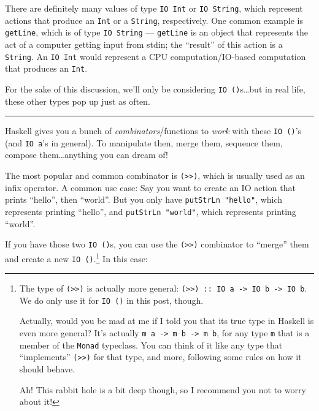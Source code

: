 \documentclass[]{article}
\begin{document}
There are definitely many values of type \texttt{IO\ Int} or
\texttt{IO\ String}, which represent actions that produce an
\texttt{Int} or a \texttt{String}, respectively. One common example is
\texttt{getLine}, which is of type \texttt{IO\ String} ---
\texttt{getLine} is an object that represents the act of a computer
getting input from stdin; the ``result'' of this action is a
\texttt{String}. An \texttt{IO\ Int} would represent a CPU
computation/IO-based computation that produces an \texttt{Int}.

For the sake of this discussion, we'll only be considering
\texttt{IO\ ()}s\ldots{}but in real life, these other types pop up just
as often.

\begin{center}\rule{0.5\linewidth}{\linethickness}\end{center}

Haskell gives you a bunch of \emph{combinators}/functions to \emph{work}
with these \texttt{IO\ ()}'s (and \texttt{IO\ a}'s in general). To
manipulate then, merge them, sequence them, compose them\ldots{}anything
you can dream of!

The most popular and common combinator is
\texttt{(\textgreater{}\textgreater{})}, which is usually used as an
infix operator. A common use case: Say you want to create an IO action
that prints ``hello'', then ``world''. But you only have
\texttt{putStrLn\ "hello"}, which represents printing ``hello'', and
\texttt{putStrLn\ "world"}, which represents printing ``world''.

If you have those two \texttt{IO\ ()}s, you can use the
\texttt{(\textgreater{}\textgreater{})} combinator to ``merge'' them and
create a new \texttt{IO\ ()}.\footnote{The type of
  \texttt{(\textgreater{}\textgreater{})} is actually more general:
  \texttt{(\textgreater{}\textgreater{})\ ::\ IO\ a\ -\textgreater{}\ IO\ b\ -\textgreater{}\ IO\ b}.
  We do only use it for \texttt{IO\ ()} in this post, though.

  Actually, would you be mad at me if I told you that its true type in
  Haskell is even more general? It's actually
  \texttt{m\ a\ -\textgreater{}\ m\ b\ -\textgreater{}\ m\ b}, for any
  type \texttt{m} that is a member of the \texttt{Monad} typeclass. You
  can think of it like any type that ``implements''
  \texttt{(\textgreater{}\textgreater{})} for that type, and more,
  following some rules on how it should behave.

  Ah! This rabbit hole is a bit deep though, so I recommend you not to
  worry about it!} In this case:
\end{document}
